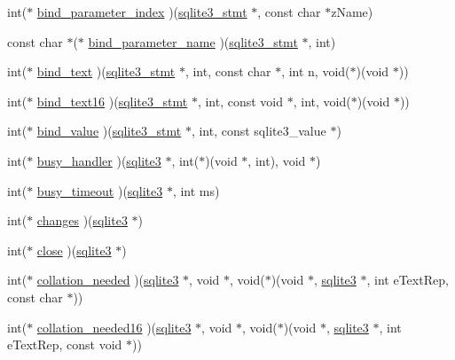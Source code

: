 \begin{DoxyCompactItemize}
\item 
int($\ast$ \hyperlink{structsqlite3__api__routines_a43a564bb094d5b9a86304beb50f69430}{bind\+\_\+parameter\+\_\+index} )(\hyperlink{sqlite3_8c_af2a033da1327cdd77f0a174a09aedd0c}{sqlite3\+\_\+stmt} $\ast$, const char $\ast$z\+Name)
\item 
const char $\ast$($\ast$ \hyperlink{structsqlite3__api__routines_a1680ea8ab78f3c1a459a4c56a91ca496}{bind\+\_\+parameter\+\_\+name} )(\hyperlink{sqlite3_8c_af2a033da1327cdd77f0a174a09aedd0c}{sqlite3\+\_\+stmt} $\ast$, int)
\item 
int($\ast$ \hyperlink{structsqlite3__api__routines_aea3f9722b1cfa2911ada47656ca88ce8}{bind\+\_\+text} )(\hyperlink{sqlite3_8c_af2a033da1327cdd77f0a174a09aedd0c}{sqlite3\+\_\+stmt} $\ast$, int, const char $\ast$, int n, void($\ast$)(void $\ast$))
\item 
int($\ast$ \hyperlink{structsqlite3__api__routines_a8dae957f5c7a3a2efd105d4bac1e85f6}{bind\+\_\+text16} )(\hyperlink{sqlite3_8c_af2a033da1327cdd77f0a174a09aedd0c}{sqlite3\+\_\+stmt} $\ast$, int, const void $\ast$, int, void($\ast$)(void $\ast$))
\item 
int($\ast$ \hyperlink{structsqlite3__api__routines_a64fdf8888afea154aed93725bd9bb1a3}{bind\+\_\+value} )(\hyperlink{sqlite3_8c_af2a033da1327cdd77f0a174a09aedd0c}{sqlite3\+\_\+stmt} $\ast$, int, const sqlite3\+\_\+value $\ast$)
\item 
int($\ast$ \hyperlink{structsqlite3__api__routines_a8050bb68d78bf3e6368042e37102bd36}{busy\+\_\+handler} )(\hyperlink{structsqlite3}{sqlite3} $\ast$, int($\ast$)(void $\ast$, int), void $\ast$)
\item 
int($\ast$ \hyperlink{structsqlite3__api__routines_a6a89f6f95a1807a592fe8b74ebe5620b}{busy\+\_\+timeout} )(\hyperlink{structsqlite3}{sqlite3} $\ast$, int ms)
\item 
int($\ast$ \hyperlink{structsqlite3__api__routines_afa73164142c6aaa87d16b3afacf0900a}{changes} )(\hyperlink{structsqlite3}{sqlite3} $\ast$)
\item 
int($\ast$ \hyperlink{structsqlite3__api__routines_ab3156009cfdafa2aa5985cd47515132b}{close} )(\hyperlink{structsqlite3}{sqlite3} $\ast$)
\item 
int($\ast$ \hyperlink{structsqlite3__api__routines_ab8f092534ece161ead0aab80770984e1}{collation\+\_\+needed} )(\hyperlink{structsqlite3}{sqlite3} $\ast$, void $\ast$, void($\ast$)(void $\ast$, \hyperlink{structsqlite3}{sqlite3} $\ast$, int e\+Text\+Rep, const char $\ast$))
\item 
int($\ast$ \hyperlink{structsqlite3__api__routines_af506e60ba603419f01920da2968776ad}{collation\+\_\+needed16} )(\hyperlink{structsqlite3}{sqlite3} $\ast$, void $\ast$, void($\ast$)(void $\ast$, \hyperlink{structsqlite3}{sqlite3} $\ast$, int e\+Text\+Rep, const void $\ast$))

\end{DoxyCompactItemize}
